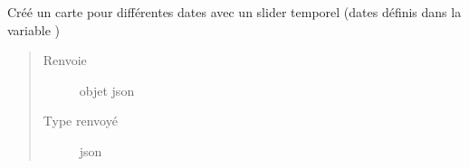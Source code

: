 \documentclass[letterpaper,10pt,french]{sphinxmanual}
\begin{document}
\begin{fulllineitems}
\begin{fulllineitems}
\begin{quote}
\begin{description}
\end{description}\end{quote}

\end{fulllineitems}


\begin{fulllineitems}
\label{\detokenize{app.home.content_gen:app.home.content_gen.map_generation.CaniculePlot.plot_cursor}}
\sphinxAtStartPar
Créé un carte pour différentes dates avec un slider temporel
(dates définis dans la variable )
\begin{quote}\begin{description}
\item[{Renvoie}] \leavevmode
\sphinxAtStartPar
objet json

\item[{Type renvoyé}] \leavevmode
\sphinxAtStartPar
json

\end{description}\end{quote}

\end{fulllineitems}


\begin{fulllineitems}
\label{\detokenize{app.home.content_gen:app.home.content_gen.map_generation.CaniculePlot.read_json}}
\end{fulllineitems}


\end{fulllineitems}

\end{document}
